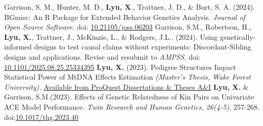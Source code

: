 \begin{cvpublications}
    
  \cvpublication
    {Garrison, S. M., Hunter, M. D., \textbf{Lyu, X}., Trattner, J. D., \& Burt, S. A. (2024). BGmisc: An R Package for Extended Behavior Genetics Analysis. \textit{Journal of Open Source Software.} doi: \href{https://scholar.google.com/citations?view_op=view_citation&hl=en&user=zxVaBpAAAAAJ&citation_for_view=zxVaBpAAAAAJ:qjMakFHDy7sC}{10.21105/joss.06203}} 
  \cvpublication
    {Garrison, S.M., Robertson, H., \textbf{Lyu, X.}, Trattner, J., McKinzie, L., \& Rodgers, J.L.. (2024). Using genetically-informed designs to test causal claims without experiments: Discordant-Sibling designs and applications. Revise and resubmit to \textit{AMPSS.} doi: \href{https://www.medrxiv.org/content/10.1101/2025.08.25.25334395v1}{10.1101/2025.08.25.25334395}}  
  \cvpublication
    {\textbf{Lyu, X. }(2023). Pedigree Structures Impact Statistical Power of MtDNA Effects Estimation \textit{(Master's Thesis, Wake Forest University).} \href{https://www.proquest.com/docview/2863241367}{Available from ProQuest Dissertations \& Theses A\&I}}
  \cvpublication
    {\textbf{Lyu, X.} \& Garrison, S.M.(2023). Effects of Genetic Relatedness of Kin Pairs on Univariate ACE Model Performance. \textit{Twin Research and Human Genetics, 26(4-5)}, 257-268. doi:\href{https://www-cambridge-org.colorado.idm.oclc.org/core/journals/twin-research-and-human-genetics/article/effects-of-genetic-relatedness-of-kin-pairs-on-univariate-ace-model-performance/7B99A4A34DF4F54CDF2184676C4744AD}{10.1017/thg.2023.40}} 
    
 
    
\end{cvpublications}
